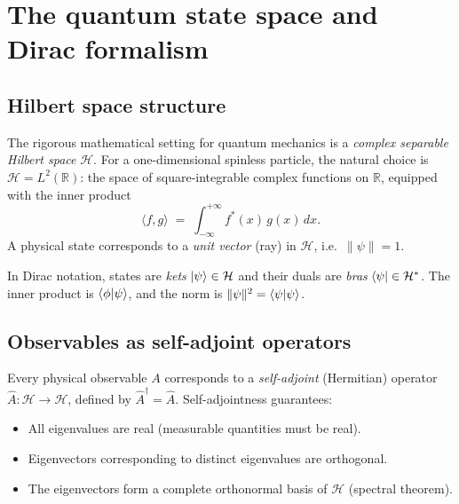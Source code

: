 \documentclass[12pt, a4paper]{article}
\begin{document}
\clearpage

\appendix

\section{The quantum state space and Dirac formalism}
\label{app:hilbert}

\subsection{Hilbert space structure}

The rigorous mathematical setting for quantum mechanics is a
\emph{complex separable Hilbert space} $\mathcal{H}$.  For a
one-dimensional spinless particle, the natural choice is
$\mathcal{H} = L^2(\mathbb{R})$: the space of square-integrable
complex functions on $\mathbb{R}$, equipped with the inner product
\begin{equation}
  \langle f, g\rangle \;=\; \int_{-\infty}^{+\infty} f^*(x)\,g(x)\,dx.
\end{equation}
A physical state corresponds to a \emph{unit vector} (ray) in
$\mathcal{H}$, i.e.\ $\|\psi\| = 1$.

In Dirac notation, states are \emph{kets} $\ket{\psi} \in \mathcal{H}$
and their duals are \emph{bras} $\bra{\psi} \in \mathcal{H}^*$.
The inner product is $\braket{\phi}{\psi}$, and the norm is
$\|\psi\|^2 = \braket{\psi}{\psi}$.

\subsection{Observables as self-adjoint operators}

Every physical observable $A$ corresponds to a \emph{self-adjoint}
(Hermitian) operator $\hat{A}: \mathcal{H} \to \mathcal{H}$, defined
by $\hat{A}^\dagger = \hat{A}$.  Self-adjointness guarantees:
\begin{itemize}
  \item All eigenvalues are real (measurable quantities must be real).
  \item Eigenvectors corresponding to distinct eigenvalues are orthogonal.
  \item The eigenvectors form a complete orthonormal basis of $\mathcal{H}$
        (spectral theorem).
\end{itemize}
\end{document}
